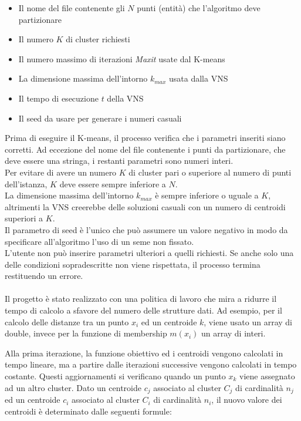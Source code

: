\documentclass[12pt,a4paper,oneside,hidelinks]{report}
\begin{document}
\begin{itemize}
\item Il nome del file contenente gli $N$ punti (entità) che l'algoritmo deve partizionare
\item Il numero $K$ di cluster richiesti 
\item Il numero massimo di iterazioni \textit{Maxit} usate dal K-means
\item La dimensione massima dell'intorno $k_{max}$ usata dalla VNS
\item Il tempo di esecuzione $t$ della VNS
\item Il seed da usare per generare i numeri casuali
\end{itemize}

Prima di eseguire il K-means, il processo verifica che i parametri inseriti siano corretti. Ad eccezione del nome del file contenente i punti da partizionare, che deve essere una stringa, i restanti parametri sono numeri interi. \\
Per evitare di avere un numero $K$ di cluster pari o superiore al numero di punti dell'istanza, $K$ deve essere sempre inferiore a $N$. \\
La dimensione massima dell'intorno $k_{max}$ è sempre inferiore o uguale a $K$, altrimenti la VNS creerebbe delle soluzioni casuali con un numero di centroidi superiori a $K$. \\
Il parametro di seed è l'unico che può assumere un valore negativo in modo da specificare all'algoritmo l'uso di un seme non fissato. \\
L'utente non può inserire parametri ulteriori a quelli richiesti.
Se anche solo una delle condizioni sopradescritte non viene rispettata, il processo termina restituendo un errore.

\paragraph*{}
Il progetto è stato realizzato con una politica di lavoro che mira a ridurre il tempo di calcolo a sfavore del numero delle strutture dati. 
Ad esempio, per il calcolo delle distanze tra un punto $x_i$ ed un centroide $k$, viene usato un array di double, invece per la funzione di membership $m(x_i)$ un array di interi.

Alla prima iterazione, la funzione obiettivo ed i centroidi vengono calcolati in tempo lineare, ma a partire dalle iterazioni successive vengono calcolati in tempo costante.
Questi aggiornamenti si verificano quando un punto $x_k$ viene assegnato ad un altro cluster.
Dato un centroide $c_j$ associato al cluster $C_j$ di cardinalità $n_j$ ed un centroide $c_i$ associato al cluster $C_i$ di cardinalità $n_i$, il nuovo valore dei centroidi è determinato dalle seguenti formule:
\end{document}
